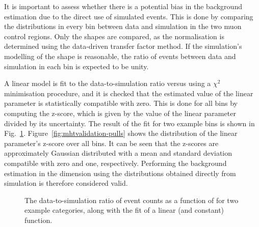 It is important to assess whether there is a potential bias in the background 
estimation due to the direct use of simulated events.
This is done by comparing the \mht distributions in every \njnbht bin between 
data and simulation in the two muon control regions. Only the shapes are 
compared, as the normalisation is determined using the data-driven transfer 
factor method. If the simulation's modelling of the \mht shape is reasonable, 
the ratio of events between data and simulation in each \mht bin is expected to 
be unity.

A linear model is fit to the data-to-simulation ratio versus \mht using a 
$\chi^2$ minimisation procedure, and it is checked that the estimated value of 
the linear parameter is statistically compatible with zero. This is done for 
all \njnbht bins by computing the z-score, which is given by the value of the 
linear parameter divided by its uncertainty. The result of the fit for two 
example \njnbht bins is shown in Fig.~\ref{fig:mhtvalidation-fits}. 
Figure~\ref{fig:mhtvalidation-pulls} shows the distribution of the linear 
parameter's z-score over all \njnbht bins. 
It can be seen that the z-scores are approximately Gaussian distributed with a 
mean and standard deviation compatible with zero and one, respectively.
Performing the background estimation in the \mht dimension using the 
distributions obtained directly from simulation is therefore considered valid.

\begin{figure}[!h]
\centering
{}
\caption{The data-to-simulation ratio of event counts as a function of \mht for 
two example \njnbht categories, along with the fit of a linear (and constant) 
function.}
\label{fig:mhtvalidation-fits}
\end{figure}

